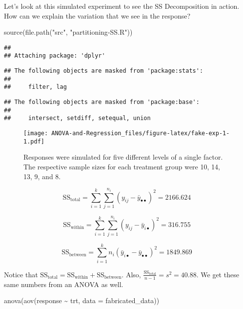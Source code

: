 \documentclass[
]{book}
\newenvironment{Shaded}{\begin{snugshade}}{\end{snugshade}}
\newcommand{\AttributeTok}[1]{\textcolor[rgb]{0.77,0.63,0.00}{#1}}
\newcommand{\FunctionTok}[1]{\textcolor[rgb]{0.00,0.00,0.00}{#1}}
\newcommand{\NormalTok}[1]{#1}
\newcommand{\SpecialCharTok}[1]{\textcolor[rgb]{0.00,0.00,0.00}{#1}}
\newcommand{\StringTok}[1]{\textcolor[rgb]{0.31,0.60,0.02}{#1}}
\begin{document}
Let's look at this simulated experiment to see the SS Decomposition in action. How can we explain the variation that we see in the response?

\begin{Shaded}
\begin{Highlighting}[]
\FunctionTok{source}\NormalTok{(}\FunctionTok{file.path}\NormalTok{(}\StringTok{"src"}\NormalTok{, }\StringTok{"partitioning{-}SS.R"}\NormalTok{))}
\end{Highlighting}
\end{Shaded}

\begin{verbatim}
## 
## Attaching package: 'dplyr'
\end{verbatim}

\begin{verbatim}
## The following objects are masked from 'package:stats':
## 
##     filter, lag
\end{verbatim}

\begin{verbatim}
## The following objects are masked from 'package:base':
## 
##     intersect, setdiff, setequal, union
\end{verbatim}

\begin{figure}
\centering
\texttt{[image: ANOVA-and-Regression\_files/figure-latex/fake-exp-1-1.pdf]}
\caption{\label{fig:fake-exp-1}Responses were simulated for five different levels of a single factor. The respective sample sizes for each treatment group were 10, 14, 13, 9, and 8.}
\end{figure}

\[\text{SS}_{\text{total}} = \sum_{i=1}^{k} \sum_{j = 1}^{n_i} \left( y_{ij} - \bar{y}_{\bullet\bullet} \right)^2 = 2166.624\]

\[\text{SS}_{\text{within}} = \sum_{i=1}^{k} \sum_{j = 1}^{n_i} \left(y_{ij} - \bar{y}_{i \bullet} \right)^2 = 316.755\]

\[\text{SS}_{\text{between}} = \sum_{i=1}^{k} n_i\left( \bar{y}_{i \bullet} - \bar{y}_{\bullet\bullet} \right)^2 = 1849.869\]

Notice that \(\text{SS}_{\text{total}} = \text{SS}_{\text{within}} + \text{SS}_{\text{between}}\). Also, \(\frac{\text{SS}_{\text{total}}}{n - 1} = s^2 = 40.88\). We get these same numbers from an ANOVA as well.

\begin{Shaded}
\begin{Highlighting}[]
\FunctionTok{anova}\NormalTok{(}\FunctionTok{aov}\NormalTok{(response }\SpecialCharTok{\textasciitilde{}}\NormalTok{ trt, }\AttributeTok{data =}\NormalTok{ fabricated\_data))}
\end{Highlighting}
\end{Shaded}
\end{document}
